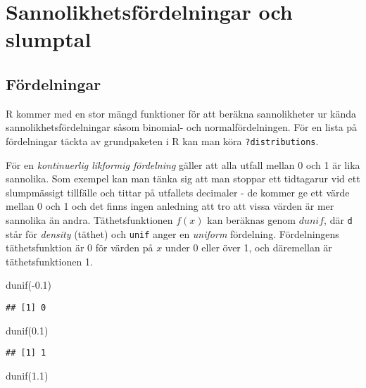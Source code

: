 \documentclass[
]{book}
\newenvironment{Shaded}{\begin{snugshade}}{\end{snugshade}}
\newcommand{\FloatTok}[1]{\textcolor[rgb]{0.00,0.00,0.81}{#1}}
\newcommand{\FunctionTok}[1]{\textcolor[rgb]{0.00,0.00,0.00}{#1}}
\newcommand{\NormalTok}[1]{#1}
\newcommand{\SpecialCharTok}[1]{\textcolor[rgb]{0.00,0.00,0.00}{#1}}
\theoremstyle{definition}
\theoremstyle{definition}
\theoremstyle{definition}
\theoremstyle{definition}
\theoremstyle{remark}
\begin{document}
\hypertarget{sannolikhetsfuxf6rdelningar-och-slumptal}{%
\chapter{Sannolikhetsfördelningar och slumptal}\label{sannolikhetsfuxf6rdelningar-och-slumptal}}

\hypertarget{fuxf6rdelningar}{%
\section{Fördelningar}\label{fuxf6rdelningar}}

R kommer med en stor mängd funktioner för att beräkna sannolikheter ur kända sannolikhetsfördelningar såsom binomial- och normalfördelningen. För en lista på fördelningar täckta av grundpaketen i R kan man köra \texttt{?distributions}.

För en \emph{kontinuerlig likformig fördelning} gäller att alla utfall mellan 0 och 1 är lika sannolika. Som exempel kan man tänka sig att man stoppar ett tidtagarur vid ett slumpmässigt tillfälle och tittar på utfallets decimaler - de kommer ge ett värde mellan 0 och 1 och det finns ingen anledning att tro att vissa värden är mer sannolika än andra. Täthetsfunktionen \(f(x)\) kan beräknas genom \(dunif\), där \texttt{d} står för \emph{density} (täthet) och \texttt{unif} anger en \emph{uniform} fördelning. Fördelningens täthetsfunktion är 0 för värden på \(x\) under 0 eller över 1, och däremellan är täthetsfunktionen 1.

\begin{Shaded}
\begin{Highlighting}[]
\FunctionTok{dunif}\NormalTok{(}\SpecialCharTok{{-}}\FloatTok{0.1}\NormalTok{)}
\end{Highlighting}
\end{Shaded}

\begin{verbatim}
## [1] 0
\end{verbatim}

\begin{Shaded}
\begin{Highlighting}[]
\FunctionTok{dunif}\NormalTok{(}\FloatTok{0.1}\NormalTok{)}
\end{Highlighting}
\end{Shaded}

\begin{verbatim}
## [1] 1
\end{verbatim}

\begin{Shaded}
\begin{Highlighting}[]
\FunctionTok{dunif}\NormalTok{(}\FloatTok{1.1}\NormalTok{)}
\end{Highlighting}
\end{Shaded}
\end{document}
